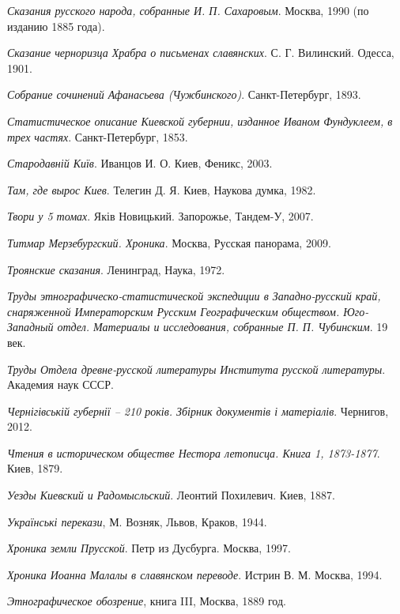 \emph{Сказания русского народа, собранные И. П. Сахаровым}. Москва, 1990 (по изданию 1885 года).

\emph{Сказание черноризца Храбра о письменах славянских}. С. Г. Вилинский. Одесса, 1901.

\emph{Собрание сочинений Афанасьева (Чужбинского)}. Санкт-Петербург, 1893.

\emph{Статистическое описание Киевской губернии,  изданное Иваном Фундуклеем, в трех частях}. Санкт-Петербург, 1853. 

\emph{Стародавній Київ}. Иванцов И. О. Киев, Феникс, 2003.

\emph{Там, где вырос Киев}.
Телегин Д. Я. Киев, Наукова думка, 1982.

\emph{Твори у 5 томах}. Яків Новицький. Запорожье, Тандем-У, 2007.

\emph{Титмар Мерзебургский. Хроника}. Москва, Русская панорама, 2009. 

\emph{Троянские сказания}. Ленинград, Наука, 1972. 

\emph{Труды этнографическо-статистической экспедиции в Западно-русский край, снаряженной Императорским Русским Географическим обществом. Юго-Западный отдел. Материалы и исследования, собранные П. П. Чубинским}. 19 век.

\emph{Труды Отдела древне-русской литературы Института русской  литературы}. Академия наук СССР.

\emph{Чернігівській губернії – 210 років. Збірник документів і матеріалів}. Чернигов, 2012.

\emph{Чтения в историческом обществе Нестора летописца. Книга 1, 1873-1877}. Киев, 1879.

\emph{Уезды Киевский и Радомысльский}. Леонтий Похилевич. Киев, 1887.

\emph{Українські перекази}, М. Возняк, Львов, Краков, 1944.  

\emph{Хроника земли Прусской}. Петр из Дусбурга. Москва, 1997.

\emph{Хроника Иоанна Малалы в славянском переводе}. Истрин В. М. Москва, 1994.

\emph{Этнографическое обозрение}, книга III, Москва, 1889 год.

